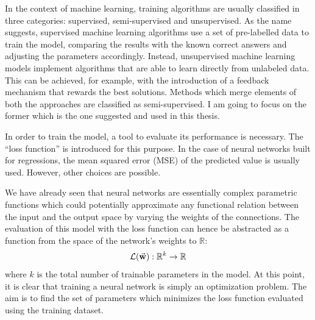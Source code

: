 \documentclass[a4paper,10pt]{report}
\begin{document}

In the context of machine learning, training algorithms are usually classified in three categories: 
supervised, semi-supervised and unsupervised.
As the name suggests, supervised machine learning algorithms use a set of pre-labelled data to 
train the model, comparing the results with the known correct answers and adjusting the parameters 
accordingly.
Instead, unsupervised machine learning models implement algorithms that are able to learn directly from 
unlabeled data. This can be achieved, for example, with the introduction of a feedback mechanism that rewards
the best solutions.
Methods which merge elements of both the approaches are classified as semi-supervised. I am going to focus on the
former which is the one suggested and used in this thesis.

In order to train the model, a tool to evaluate its performance is necessary.
The ``loss function'' is introduced for this purpose. In the case of neural networks built for 
regressions, the mean squared error (MSE) of the predicted value
is usually used. However, other choices are possible.

We have already seen that neural networks are essentially complex parametric functions
which could potentially approximate any functional relation between the input and the
output space by varying the weights of the connections. The evaluation of this model
with the loss function can hence be abstracted as a function from the space of the 
network's weights to $\mathbb{R}$:
\begin{equation}
    \mathcal{L}(\va{w}): \mathbb{R}^k \rightarrow \mathbb{R}
\end{equation}
where $k$ is the total number of trainable parameters in the model.
At this point, it is clear that 
training a neural network is simply an optimization problem.
The aim is to find the set of parameters which minimizes the loss function evaluated using 
the training dataset.
\end{document}
